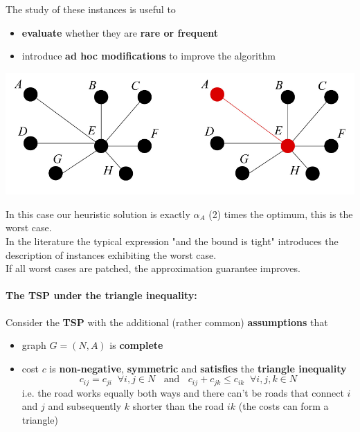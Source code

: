 The study of these instances is useful to
\begin{itemize}
	\item \textbf{evaluate} whether they are \textbf{rare or frequent}
	\item introduce \textbf{ad hoc modifications} to improve the algorithm
\end{itemize}
\begin{center}
	\includegraphics[width=0.8\columnwidth]{img/VCP2Approx2}
\end{center}
In this case our heuristic solution is exactly $\alpha_A$ (2) times the optimum, this is the worst case.\\

In the literature the typical expression "and the bound is tight" introduces the description of instances exhibiting the worst case.\\
If all worst cases are patched, the approximation guarantee improves.\\

\newpage

\paragraph{The TSP under the triangle inequality:} Consider the \textbf{TSP} with the additional (rather common) \textbf{assumptions} that
\begin{itemize}
	\item graph $G = (N, A)$ is \textbf{complete}
	\item cost $c$ is \textbf{non-negative}, \textbf{symmetric} and \textbf{satisfies} the \textbf{triangle inequality}
	$$ c_{ij} = c_{ji} \;\; \forall i,j \in N \;\; \text{ and } \;\; c_{ij} + c_{jk} \leq c_{ik} \;\; \forall i,j,k \in N $$
	i.e. the road works equally both ways and there can't be roads that connect $i$ and $j$ and subsequently $k$ shorter than the road $ik$ (the costs can form a triangle)
\end{itemize}

